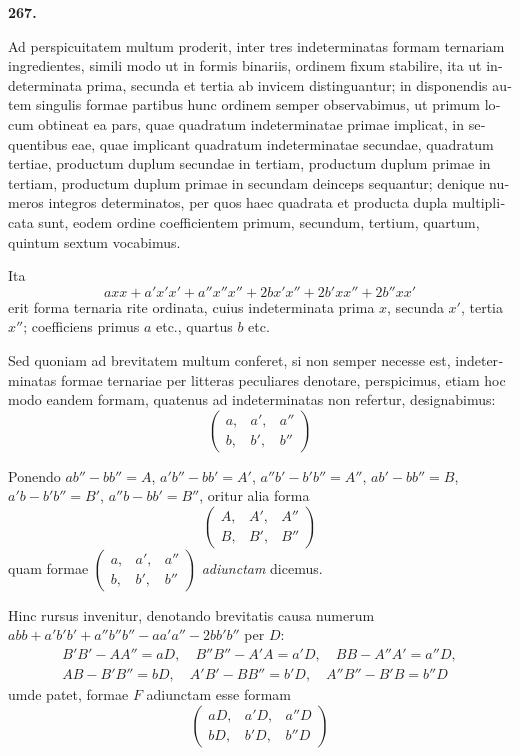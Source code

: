 \documentclass[12pt,a4paper]{article}
\theoremstyle{plain}
\theoremstyle{definition}
\theoremstyle{remark}
\begin{document}
\begin{otherlanguage}{latin}
\bigskip

\textbf{267.}

Ad perspicuitatem multum proderit, inter tres indeterminatas formam ternariam ingredientes, simili modo ut in formis binariis, ordinem fixum stabilire, ita ut indeterminata prima, secunda et tertia ab invicem distinguantur; in disponendis autem singulis formae partibus hunc ordinem semper observabimus, ut primum locum obtineat ea pars, quae quadratum indeterminatae primae implicat, in sequentibus eae, quae implicant quadratum indeterminatae secundae, quadratum tertiae, productum duplum secundae in tertiam, productum duplum primae in tertiam, productum duplum primae in secundam deinceps sequantur; denique numeros integros determinatos, per quos haec quadrata et producta dupla multiplicata sunt, eodem ordine coefficientem primum, secundum, tertium, quartum, quintum sextum vocabimus.

Ita
\[
axx + a'x'x' + a''x''x'' + 2bx'x'' + 2b'xx'' + 2b''xx'
\]
erit forma ternaria rite ordinata, cuius indeterminata prima $x$, secunda $x'$, tertia $x''$; coefficiens primus $a$ etc., quartus $b$ etc.

Sed quoniam ad brevitatem multum conferet, si non semper necesse est, indeterminatas formae ternariae per litteras peculiares denotare, perspicimus, etiam hoc modo eandem formam, quatenus ad indeterminatas non refertur, designabimus:
\[
\begin{pmatrix} a, & a', & a'' \\ b, & b', & b'' \end{pmatrix}
\]

Ponendo $ab'' - bb'' = A$, $a'b'' - bb' = A'$, $a''b' - b'b'' = A''$, $ab' - bb'' = B$, $a'b - b'b'' = B'$, $a''b - bb' = B''$, oritur alia forma
\[
\begin{pmatrix} A, & A', & A'' \\ B, & B', & B'' \end{pmatrix}
\]
quam formae $\begin{pmatrix} a, & a', & a'' \\ b, & b', & b'' \end{pmatrix}$ \emph{adiunctam} dicemus.

Hinc rursus invenitur, denotando brevitatis causa numerum $abb + a'b'b' + a''b''b'' - aa'a'' - 2bb'b''$ per $D$:
\begin{gather*}
B'B' - AA'' = aD, \quad B''B'' - A'A = a'D, \quad BB - A''A' = a''D,\\
AB - B'B'' = bD, \quad A'B' - BB'' = b'D, \quad A''B'' - B'B = b''D
\end{gather*}
umde patet, formae $F$ adiunctam esse formam
\[
\begin{pmatrix} aD, & a'D, & a''D \\ bD, & b'D, & b''D \end{pmatrix}
\]


\end{otherlanguage}
\end{document}
